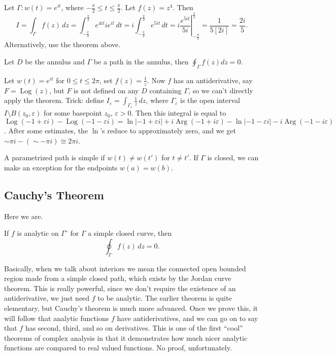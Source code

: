 \begin{example}
    Let $\Gamma \colon w(t)=e^{it}$, where $-\frac{\pi}{2}\leq t \leq \frac{\pi}{2}$. Let $f(z)=z^4$. Then \[
        I=\int_{\Gamma }^{} f(z) \, dz=\int_{-\frac{\pi}{2}}^{\frac{\pi}{2}}e^{4it}ie^{it}  \, dt=i \int_{-\frac{\pi}{2}}^{\frac{\pi}{2}} e^{5it} \, dt= \left.i \frac{e^{5it}}{5i}  \right|_{-\frac{\pi}{2}}^{\frac{\pi}{2}}=\frac{1}{5[2i]}=\frac{2i}{5}.
    \] Alternatively, use the theorem above.
\end{example}
\begin{example}
    Let $D$ be the annulus and $\Gamma $ be a path in the annulus, then $\oint_{\Gamma }f(z)dz=0$.
\end{example}
\begin{example}
    Let $w(t)=e^{it}$ for $0\leq t \leq 2\pi$, set $f(z)=\frac{1}{z}$. Now $f$ has an antiderivative, say $F=\operatorname{Log}(z)$, but $F$ is not defined on any $D$ containing $\Gamma $, so we can't directly apply the theorem. Trick: define $I_{\varepsilon }=\int_{\Gamma _{\varepsilon }}^{} \frac{1}{z} \, dz$, where $\Gamma _{\varepsilon }$ is the open interval $I\setminus B(z_0,\varepsilon )$ for some basepoint $z_0$, $\varepsilon >0$. Then this integral is equal to $\operatorname{Log}(-1+\varepsilon i)-\operatorname{Log}(-1-\varepsilon i)=\ln |-1+\varepsilon i|+i\operatorname{Arg}(-1+i\varepsilon ) - \ln|-1-\varepsilon i|-i \operatorname{Arg}(-1-i\varepsilon )$. After some estimates, the $\ln$'s reduce to approximately zero, and we get $\sim \pi i -(\sim -\pi i)\cong 2\pi i $.
\end{example}
\begin{definition}
    A parametrized path is simple if $w(t)\neq w(t')$ for $t\neq t'$. If $\Gamma $ is closed, we can make an exception for the endpoints $w(a)=w(b)$.
\end{definition}
\subsection{Cauchy's Theorem}
Here we are.
\begin{theorem}\label{ct}
   If $f$ is analytic on $\Gamma ^{\circ }$ for $\Gamma $ a simple closed curve, then \[
       \oint_{\Gamma }^{} f(z) \, dz=0. 
   \] 
\end{theorem}
Basically, when we talk about interiors we mean the connected open bounded region made from a simple closed path, which exists by the Jordan curve theorem. This is really powerful, since we don't require the existence of an antiderivative, we just need $f$ to be analytic. The earlier theorem is quite elementary, but Cauchy's theorem is much more advanced. Once we prove this, it will follow that analytic functions $f$ have antiderivatives, and we can go on to say that $f$ has second, third, and so on derivatives. This is one of the first ``cool'' theorems of complex analysis in that it demonstrates how much nicer analytic functions are compared to real valued functions. No proof, unfortunately.

